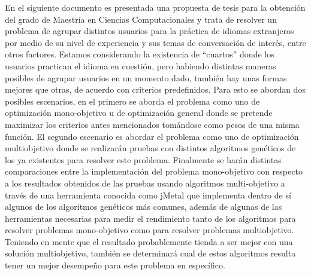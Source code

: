 En el siguiente documento es presentada una propuesta de tesis para la obtención del grado de Maestría en Ciencias Computacionales y trata de resolver un problema de agrupar distintos usuarios para la práctica de idiomas extranjeros por medio de su nivel de experiencia y sus temas de conversación de interés, entre otros factores. Estamos considerando la existencia de “cuartos” donde los usuarios practican el idioma en cuestión, pero habiendo distintas maneras posibles de agrupar usuarios en un momento dado, también hay unas formas mejores que otras, de acuerdo con criterios predefinidos. Para esto se abordan dos posibles escenarios, en el primero se aborda el problema como uno de optimización mono-objetivo u de optimización general donde se pretende maximizar los criterios antes mencionados tomándose como pesos de una misma función. El segundo escenario es abordar el problema como uno de optimización multiobjetivo donde se realizarán pruebas con distintos algoritmos genéticos de los ya existentes para resolver este problema. Finalmente se harán distintas comparaciones entre la implementación del problema mono-objetivo con respecto a los resultados obtenidos de las pruebas usando algoritmos multi-objetivo a través de una herramienta conocida como jMetal que implementa dentro de sí algunos de los algoritmos genéticos más comunes, además de algunas de las herramientas necesarias para medir el rendimiento tanto de los algoritmos para resolver problemas mono-objetivo como para resolver problemas multiobjetivo. Teniendo en mente que el resultado probablemente tienda a ser mejor con una solución multiobjetivo, también se determinará cual de estos algoritmos resulta tener un mejor desempeño para este problema en específico.